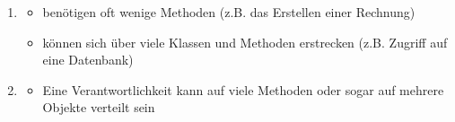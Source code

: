 \begin{infoBox}[title=Wichtige Punkte]
    \begin{enumerate}
        \item {}
        \begin{itemize}
            \item {} benötigen oft wenige Methoden (z.B. das Erstellen einer Rechnung)
            \item {} können sich über viele Klassen und Methoden erstrecken (z.B. Zugriff auf eine Datenbank)
        \end{itemize}
        \item {}
        \begin{itemize}
            \item Eine Verantwortlichkeit kann auf viele Methoden oder sogar auf mehrere Objekte verteilt sein
        \end{itemize}
    \end{enumerate}
\end{infoBox}
